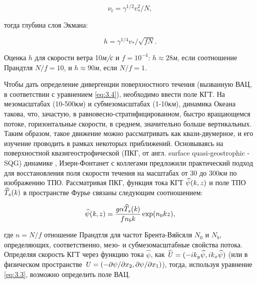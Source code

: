 \begin{equation} \label{eq:3.6} \nu _{t} =\gamma ^{1/2} v_{*}^{2} /N,  \end{equation}



\noindent тогда глубина слоя Экмана:



\begin{equation} \label{eq:3.7} h=\gamma ^{1/4} v_{*} /\sqrt{fN} .  \end{equation} 



Оценка $h$ для скорости ветра 10\textit{м/с} и $f=10^{-4} $: $h\approx 28$\textit{м}, если соотношение Прандтля $N/f=10$, и $h\approx 90$\textit{м}, если $N/f=1$.

Чтобы дать определение дивергенции поверхностного течения (вызванную ВАЦ, в соответствии с уравнением \eqref{eq:3.4}), необходимо ввести поле КГТ. На мезомасштабах (10-500\textit{км}) и субмезомасштабах (1-10\textit{км}), динамика Океана такова, что, зачастую, в равновесно-стратифицированном, быстро вращающемся потоке, горизонтальные скорости, в среднем, значительно больше вертикальных. Таким образом, такое движение можно рассматривать как квази-двумерное, и его изучение проводить в рамках некоторых приближений. Основываясь на поверхностной квазигеострофической (ПКГ, от англ. surface quasi-geostrophic - SQG) динамике \citep{Held1995,Lapeyre2006}, Изерн-Фонтанет с коллегами \citep{Isern-Fontanet2008} предложили практический подход для восстановления поля скорости течения на масштабах от 30 до 300\textit{км} по изображению ТПО. Рассматривая ПКГ, функция тока КГТ $\widehat{\psi }({\it k},z)$ и поле ТПО $\widehat{T}_{s} ({\it k})$ в пространстве Фурье связаны следующим соотношением:



\begin{equation} \label{eq:3.8} \widehat{\psi }({\it k},z)=\frac{g\alpha \widehat{T}_{s} ({\it k})}{fn_{b} k} \exp (n_{0} kz),  \end{equation} 



\noindent где $n=N/f$ отношение Прандтля для частот Брента-Вяйсяля $N_{0} $ и $N_{b} $, определяющих, соответственно, мезо- и субмезомасштабные свойства потока. Определяя скорость КГТ через функцию тока $\widehat{\psi }$, как $\widehat{{\it U}}=(-ik_{y} \widehat{\psi },ik_{x} \widehat{\psi })$ (или в физическом пространстве ${\it U}=(-\partial \psi /\partial x_{2} ,\partial \psi /\partial x_{1} )$), тогда, используя уравнение \eqref{eq:3.3}, возможно определить поле ВАЦ. 

